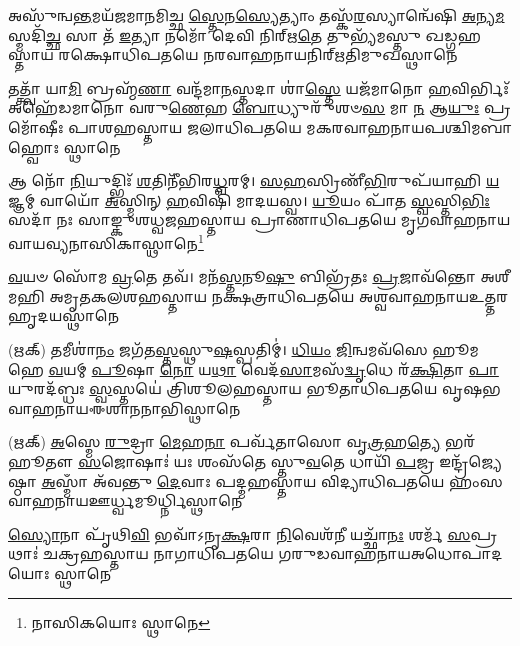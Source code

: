 %
{𑌅𑌸𑍁᳴𑌨𑍍𑌵\-\ul{𑌨𑍍𑌤}\-𑌮𑌯᳴𑌜𑌮𑌾𑌨𑌮𑌿𑌚𑍍𑌛 \ul{𑌸𑍍𑌤𑍇}\-𑌨\-\ul{𑌸𑍍𑌯𑍇}\-𑌤𑍍𑌯𑌾𑌂 𑌤𑌸𑍍𑌕᳴\-\ul{𑌰}\-𑌸𑍍𑌯𑌾𑌨𑍍𑌵𑍇᳴𑌷𑌿}%
{\-\ul{𑌅}\-𑌨𑍍𑌯\-\ul{𑌮}\-𑌸𑍍𑌮𑌦𑌿᳴\-\ul{𑌚𑍍𑌛} 𑌸𑌾 𑌤᳴ \ul{𑌇}\-𑌤𑍍𑌯𑌾 𑌨𑌮𑍋᳴ 𑌦𑍇𑌵𑌿 𑌨𑌿𑌰𑍍‌𑌋\-\ul{𑌤𑍇} 𑌤𑍁𑌭𑍍𑌯᳴𑌮𑌸𑍍𑌤𑍁}%
{𑌖𑌡𑍍𑌗𑌹𑌸𑍍𑌤𑌾𑌯 𑌰𑌕𑍍𑌷𑍋𑌧𑌿𑌪𑌤𑌯𑍇 𑌨𑌰𑌵𑌾𑌹𑌨𑌾𑌯}{𑌨𑌿𑌰𑍍‌𑌋𑌤𑌿}{𑌮𑍁𑌖𑌸𑍍𑌥𑌾𑌨𑍇}

%
{𑌤𑌤𑍍𑌤𑍍𑌵𑌾᳴ 𑌯𑌾\-\ul{𑌮𑌿} 𑌬𑍍𑌰𑌹𑍍𑌮᳴\-\ul{𑌣𑌾} 𑌵𑌨𑍍𑌦᳴𑌮𑌾\-\ul{𑌨}\-𑌸𑍍𑌤𑌦𑌾 𑌶𑌾॑\-\ul{𑌸𑍍𑌤𑍇} 𑌯𑌜᳴𑌮𑌾𑌨𑍋 \ul{𑌹}\-𑌵𑌿𑌰𑍍𑌭𑌿𑌃᳴}%
{𑌅𑌹𑍇᳴𑌡𑌮𑌾𑌨𑍋 𑌵𑌰𑍁\-\ul{𑌣𑍇}\-𑌹 \ul{𑌬𑍋}\-𑌧𑍍𑌯𑍁𑌰𑍁᳴𑌶𑍞\-\ul{𑌸} 𑌮𑌾 \ul{𑌨} 𑌆\-\ul{𑌯𑍁𑌃} 𑌪𑍍𑌰𑌮𑍋᳴𑌷𑍀𑌃}%
{𑌪𑌾𑌶𑌹𑌸𑍍𑌤𑌾𑌯 𑌜𑌲𑌾𑌧𑌿𑌪𑌤𑌯𑍇 𑌮𑌕𑌰𑌵𑌾𑌹𑌨𑌾𑌯}{𑌪𑌶𑍍𑌚𑌿𑌮}{𑌬𑌾𑌹𑍍𑌵𑍋𑌃 𑌸𑍍𑌥𑌾𑌨𑍇}

%
{𑌆 𑌨𑍋᳴ \ul{𑌨𑌿}\-𑌯𑍁𑌦𑍍𑌭𑌿𑌃᳴ \ul{𑌶}\-𑌤𑌿𑌨𑍀᳴𑌭𑌿𑌰\-\ul{𑌧𑍍𑌵}\-𑌰𑌮𑍍। \ul{𑌸}\-\-\ul{𑌹}\-𑌸𑍍𑌰𑌿𑌣𑍀᳴\-\ul{𑌭𑌿}\-𑌰𑍁𑌪᳴\-𑌯𑌾𑌹𑌿 \ul{𑌯}\-𑌜𑍍𑌞𑌮𑍍}%
{𑌵𑌾𑌯𑍋᳴ \ul{𑌅}\-𑌸𑍍𑌮𑌿𑌨𑍍 \ul{𑌹}\-𑌵𑌿𑌷𑌿᳴ 𑌮𑌾𑌦𑌯𑌸𑍍𑌵। \ul{𑌯𑍂}\-𑌯𑌂 𑌪𑌾᳴𑌤 \ul{𑌸𑍍𑌵}\-𑌸𑍍𑌤𑌿\-\ul{𑌭𑌿𑌃} 𑌸𑌦𑌾᳴ 𑌨𑌃}%
{𑌸𑌾𑌙𑍍𑌕𑍁𑌶𑌧𑍍𑌵𑌜𑌹𑌸𑍍𑌤𑌾𑌯 𑌪𑍍𑌰𑌾𑌣𑌾𑌧𑌿𑌪𑌤𑌯𑍇 𑌮𑍃𑌗𑌵𑌾𑌹𑌨𑌾𑌯}{𑌵𑌾𑌯𑌵𑍍𑌯}{𑌨𑌾𑌸𑌿𑌕𑌾𑌸𑍍𑌥𑌾𑌨𑍇\footnote{𑌨𑌾𑌸𑌿𑌕𑌯𑍋𑌃 𑌸𑍍𑌥𑌾𑌨𑍇}}

%
{\-\ul{𑌵}\-𑌯𑍞 𑌸𑍋᳴𑌮 \ul{𑌵𑍍𑌰}\-𑌤𑍇 𑌤𑌵᳴। 𑌮𑌨᳴\-\ul{𑌸𑍍𑌤}\-𑌨𑍂\-\ul{𑌷𑍁} 𑌬𑌿𑌭𑍍𑌰᳴𑌤𑌃}%
{\-\ul{𑌪𑍍𑌰}\-𑌜𑌾𑌵᳴𑌨𑍍𑌤𑍋 𑌅𑌶𑍀𑌮𑌹𑌿}%
{𑌅𑌮𑍃𑌤𑌕𑌲𑌶𑌹𑌸𑍍𑌤𑌾𑌯 𑌨𑌕𑍍𑌷𑌤𑍍𑌰𑌾𑌧𑌿𑌪𑌤𑌯𑍇 𑌅𑌶𑍍𑌵𑌵𑌾𑌹𑌨𑌾𑌯}{𑌉𑌤𑍍𑌤𑌰}{𑌹𑍃𑌦𑌯𑌸𑍍𑌥𑌾𑌨𑍇}

%
{(𑌋𑌕𑍍) 𑌤𑌮𑍀𑌶𑌾॑\-\ul{𑌨𑌂} 𑌜𑌗᳴𑌤\-\ul{𑌸𑍍𑌤}\-𑌸𑍍𑌥𑍁\-\ul{𑌷}\-𑌸𑍍𑌪𑌤𑌿𑌮𑍍॑। \ul{𑌧𑌿}\-\-\ul{𑌯𑌂} \ul{𑌜𑌿}\-𑌨𑍍𑌵𑌮𑌵᳴𑌸𑍇 𑌹𑍂𑌮𑌹𑍇 \ul{𑌵}\-𑌯𑌮𑍍}%
{\-\ul{𑌪𑍂}\-𑌷𑌾 \ul{𑌨𑍋} 𑌯\-\ul{𑌥𑌾} 𑌵𑍇𑌦᳴\-\ul{𑌸𑌾}\-𑌮𑌸᳴\-\ul{𑌦𑍍𑌵𑍃}\-𑌧𑍇 𑌰᳴\-\ul{𑌕𑍍𑌷𑌿}\-𑌤𑌾 \ul{𑌪𑌾}\-𑌯𑍁𑌰𑌦᳴𑌬𑍍𑌧𑌃 \ul{𑌸𑍍𑌵}\-𑌸𑍍𑌤𑌯𑍇॑}
{𑌤𑍍𑌰𑌿𑌶𑍂𑌲𑌹𑌸𑍍𑌤𑌾𑌯 𑌭𑍂𑌤𑌾𑌧𑌿𑌪𑌤𑌯𑍇 𑌵𑍃𑌷𑌭𑌵𑌾𑌹𑌨𑌾𑌯}{𑌈𑌶𑌾𑌨}{𑌨𑌾𑌭𑌿𑌸𑍍𑌥𑌾𑌨𑍇}

%
{(𑌋𑌕𑍍) \ul{𑌅}\-𑌸𑍍𑌮𑍇 \ul{𑌰𑍁}\-𑌦𑍍𑌰𑌾 \ul{𑌮𑍇}\-𑌹\-\ul{𑌨𑌾} 𑌪𑌰𑍍𑌵᳴𑌤𑌾𑌸𑍋 𑌵𑍃\-\ul{𑌤𑍍𑌰}\-𑌹\-\ul{𑌤𑍍𑌯𑍇} 𑌭𑌰᳴𑌹𑍂𑌤𑍗 \ul{𑌸}\-𑌜𑍋𑌷𑌾𑌃॑ }%
{𑌯𑌃 𑌶𑌂𑌸᳴𑌤𑍇 𑌸𑍍𑌤𑍁\-\ul{𑌵}\-𑌤𑍇 𑌧𑌾𑌯𑌿᳴ \ul{𑌪}\-𑌜𑍍𑌰 𑌇𑌨𑍍𑌦𑍍𑌰᳴𑌜𑍍𑌯𑍇𑌷𑍍𑌠𑌾 \ul{𑌅}\-𑌸𑍍𑌮𑌾𑌁 𑌅᳴𑌵𑌨𑍍𑌤𑍁 \ul{𑌦𑍇}\-𑌵𑌾𑌃}%
{𑌪𑌦𑍍𑌮𑌹𑌸𑍍𑌤𑌾𑌯 𑌵𑌿𑌦𑍍𑌯𑌾𑌧𑌿𑌪𑌤𑌯𑍇 𑌹𑌂𑌸𑌵𑌾𑌹𑌨𑌾𑌯}{𑌊𑌰𑍍𑌧𑍍𑌵}{𑌮𑍂𑌰𑍍𑌧𑍍𑌨𑌿𑌸𑍍𑌥𑌾𑌨𑍇}


%
{\-\ul{𑌸𑍍𑌯𑍋}\-𑌨𑌾 𑌪𑍃᳴𑌥𑌿\-\ul{𑌵𑌿} 𑌭𑌵𑌾᳴𑌽𑌨𑍃\-\ul{𑌕𑍍𑌷}\-𑌰𑌾 \ul{𑌨𑌿}\-𑌵𑍇𑌶᳴𑌨𑍀}%
{𑌯𑌚𑍍𑌛𑌾᳴\-\ul{𑌨𑌃} 𑌶𑌰𑍍𑌮᳴ \ul{𑌸}\-𑌪𑍍𑌰𑌥𑌾𑌃॑}%
{𑌚𑌕𑍍𑌰𑌹𑌸𑍍𑌤𑌾𑌯 𑌨𑌾𑌗𑌾𑌧𑌿𑌪𑌤𑌯𑍇 𑌗𑌰𑍁𑌡𑌵𑌾𑌹𑌨𑌾𑌯}{𑌅𑌧𑍋}{𑌪𑌾𑌦𑌯𑍋𑌃 𑌸𑍍𑌥𑌾𑌨𑍇}

